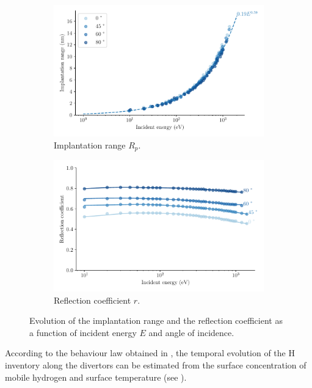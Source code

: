 \begin{figure}[h]
    \centering
    \begin{subfigure}{0.5\linewidth}
        \includegraphics[width=\linewidth]{Figures/Chapter4/implantation_range.pdf}
        \caption{Implantation range $R_p$.}
    \end{subfigure}%
    \begin{subfigure}{0.5\linewidth}                          
        \includegraphics[width=\linewidth]{Figures/Chapter4/reflection_coeff.pdf}
        \caption{Reflection coefficient $r$.}
    \end{subfigure}
    \caption{Evolution of the implantation range and the reflection coefficient as a function of incident energy $E$ and angle of incidence.}
\end{figure}

According to the behaviour law obtained in , the temporal evolution of the H inventory along the divertors can be estimated from the surface concentration of mobile hydrogen and surface temperature (see ).

